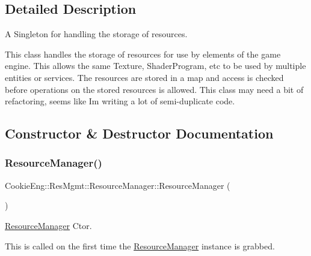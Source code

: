 \subsection{Detailed Description}
A Singleton for handling the storage of resources. 

This class handles the storage of resources for use by elements of the game engine. This allows the same Texture, Shader\+Program, etc to be used by multiple entities or services. The resources are stored in a map and access is checked before operations on the stored resources is allowed. This class may need a bit of refactoring, seems like I\textquotesingle{}m writing a lot of semi-\/duplicate code. 

\subsection{Constructor \& Destructor Documentation}
\mbox{\label{class_cookie_eng_1_1_res_mgmt_1_1_resource_manager_abfe4d3430237d9faddf0e4d77050728b}} 
\subsubsection{\texorpdfstring{Resource\+Manager()}{ResourceManager()}}
{\footnotesize\ttfamily Cookie\+Eng\+::\+Res\+Mgmt\+::\+Resource\+Manager\+::\+Resource\+Manager (\begin{DoxyParamCaption}{ }\end{DoxyParamCaption})\hspace{0.3cm}{\ttfamily [protected]}}



\hyperlink{class_cookie_eng_1_1_res_mgmt_1_1_resource_manager}{Resource\+Manager} Ctor. 

This is called on the first time the \hyperlink{class_cookie_eng_1_1_res_mgmt_1_1_resource_manager}{Resource\+Manager} instance is grabbed. \mbox{\label{class_cookie_eng_1_1_res_mgmt_1_1_resource_manager_a39c067aab5b12a48673b3b8c1fd0e442}} 

